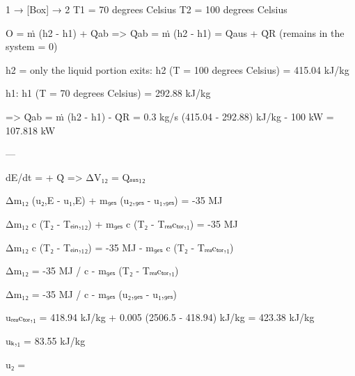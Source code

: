 1 → [Box] → 2  
T1 = 70 degrees Celsius  
T2 = 100 degrees Celsius  

O = ṁ (h2 - h1) + Q̇ab => Q̇ab = ṁ (h2 - h1) = Q̇aus + Q̇R  
(remains in the system = 0)  

h2 = only the liquid portion exits:  
h2 (T = 100 degrees Celsius) = 415.04 kJ/kg  

h1:  
h1 (T = 70 degrees Celsius) = 292.88 kJ/kg  

=> Q̇ab = ṁ (h2 - h1) - Q̇R = 0.3 kg/s (415.04 - 292.88) kJ/kg - 100 kW  
= 107.818 kW  

---

dE/dt = + Q̇ => ΔV₁₂ = Qₐᵤₛ₁₂  

Δm₁₂ (u₂,E - u₁,E) + m₉ₑₛ (u₂,₉ₑₛ - u₁,₉ₑₛ) = -35 MJ  

Δm₁₂ c (T₂ - Tₑᵢₙ,₁₂) + m₉ₑₛ c (T₂ - Tᵣₑₐcₜₒᵣ,₁) = -35 MJ  

Δm₁₂ c (T₂ - Tₑᵢₙ,₁₂) = -35 MJ - m₉ₑₛ c (T₂ - Tᵣₑₐcₜₒᵣ,₁)  

Δm₁₂ = -35 MJ / c - m₉ₑₛ (T₂ - Tᵣₑₐcₜₒᵣ,₁)  

Δm₁₂ = -35 MJ / c - m₉ₑₛ (u₂,₉ₑₛ - u₁,₉ₑₛ)  

uᵣₑₐcₜₒᵣ,₁ = 418.94 kJ/kg + 0.005 (2506.5 - 418.94) kJ/kg = 423.38 kJ/kg  

uₖ,₁ = 83.55 kJ/kg  

u₂ =